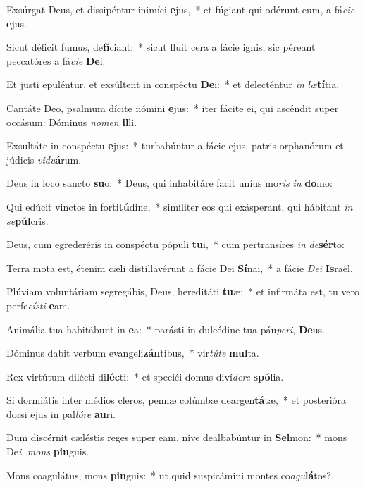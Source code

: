 \item Exsúrgat Deus, et dissipéntur inimíci \textbf{e}jus,~* et fúgiant qui odérunt eum, a fá\textit{ci}\textit{e} \textbf{e}jus.
\item Sicut déficit fumus, de\textbf{fí}\-ciant:~* sicut fluit cera a fácie ignis, sic péreant peccatóres a fá\textit{ci}\textit{e} \textbf{De}i.
\item Et justi epuléntur, et exsúltent in conspéctu \textbf{De}i:~* et delecténtur \textit{in} \textit{læ}\textbf{tí}tia.
\item Cantáte Deo, psalmum dícite nómini \textbf{e}jus:~* iter fácite ei, qui ascéndit super occásum: Dóminus \textit{no}\textit{men} \textbf{il}li.
\item Exsultáte in conspéctu \textbf{e}jus:~* turbabúntur a fácie ejus, patris orphanórum et júdicis \textit{vi}\textit{du}\textbf{á}rum.
\item Deus in loco sancto \textbf{su}o:~* Deus, qui inhabitáre facit uníus mo\textit{ris} \textit{in} \textbf{do}mo:
\item Qui edúcit vinctos in forti\textbf{tú}dine,~* simíliter eos qui exásperant, qui hábitant \textit{in} \textit{se}\textbf{púl}cris.
\item Deus, cum egrederéris in conspéctu pópuli \textbf{tu}i,~* cum pertransíres \textit{in} \textit{de}\textbf{sér}to:
\item Terra mota est, étenim cæli distillavérunt a fácie Dei \textbf{Sí}nai,~* a fácie \textit{De}\textit{i} \textbf{Is}raël.
\item Plúviam voluntáriam segregábis, Deus, hereditáti \textbf{tu}æ:~* et infirmáta est, tu vero perfe\textit{cís}\textit{ti} \textbf{e}am.
\item Animália tua habitábunt in \textbf{e}a:~* parásti in dulcédine tua páu\textit{pe}\textit{ri}, \textbf{De}us.
\item Dóminus dabit verbum evangeli\textbf{zán}tibus,~* vir\textit{tú}\textit{te} \textbf{mul}ta.
\item Rex virtútum dilécti di\textbf{léc}ti:~* et speciéi domus diví\textit{de}\textit{re} \textbf{spó}lia.
\item Si dormiátis inter médios cleros, pennæ colúmbæ deargen\textbf{tá}tæ,~* et posterióra dorsi ejus in pal\textit{ló}\textit{re} \textbf{au}ri.
\item Dum discérnit cæléstis reges super eam, nive dealbabúntur in \textbf{Sel}mon:~* mons De\textit{i}, \textit{mons} \textbf{pin}guis.
\item Mons coagulátus, mons \textbf{pin}guis:~* ut quid suspicámini montes co\textit{a}\textit{gu}\textbf{lá}tos?
